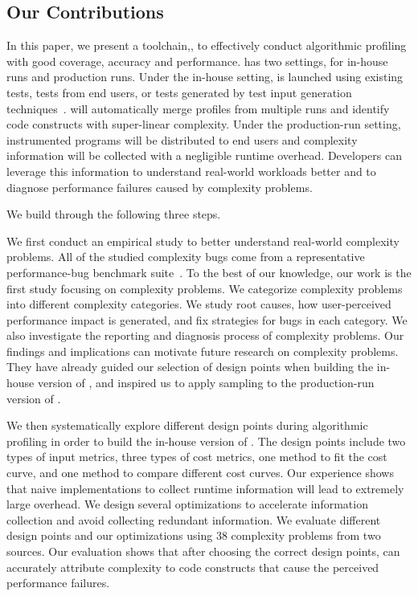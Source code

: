 \subsection{Our Contributions}
\label{sec:con}

In this paper, 
we present a toolchain,\Tool, to effectively conduct algorithmic profiling with 
good coverage, accuracy and performance. 
\Tool has two settings, for in-house runs and production runs. 
Under the in-house setting, 
\Tool is launched using existing tests, tests from end users, 
or tests generated by test input generation techniques~\cite{KLEE,s2e,dart,EventBreak}. 
\Tool will automatically merge profiles from multiple runs and 
identify code constructs with super-linear complexity. 
Under the production-run setting, 
instrumented programs will be distributed to end users 
and complexity information will be collected with a negligible runtime overhead. 
Developers can leverage this information to understand real-world workloads better
and to diagnose performance failures caused by complexity problems. 


We build \Tool through the following three steps.

We first conduct an empirical study to better understand 
real-world complexity problems.
All of the studied complexity bugs come from a representative 
performance-bug benchmark suite~\cite{PerfBug,SongOOPSLA2014}.
To the best of our knowledge, our work is the first study focusing on complexity problems.
We categorize complexity problems into different complexity categories.
We study root causes, 
how user-perceived performance impact is generated, 
and fix strategies for bugs in each category. 
We also investigate the reporting and diagnosis process of complexity problems.
Our findings and implications can motivate future research on complexity problems. 
They have already guided our selection of design points when building the in-house version of \Tool, 
and inspired us to apply sampling to the production-run version of \Tool. 

We then systematically explore different design points during algorithmic profiling 
in order to build the in-house version of \Tool. 
The design points include two types of input metrics, 
three types of cost metrics, 
one method to fit the cost curve, 
and one method to compare different cost curves. 
Our experience shows that naive implementations 
to collect runtime information
will lead to extremely large overhead. 
We design several optimizations to accelerate information collection 
and avoid collecting redundant information.  
We evaluate different design points and our optimizations 
using $38$ complexity problems from two sources. 
Our evaluation shows that after choosing the correct design points, 
\Tool can accurately attribute complexity to code constructs 
that cause the perceived performance failures. 

